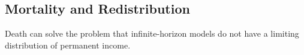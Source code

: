 \documentclass[BufferStockTheory]{subfiles}
\begin{document}
\begin{comment}
\hypertarget{Consumption-and-Income-Growth-at-the-Household-Level}{}
\subsection{Identical Growth in Income, Consumption, and Wealth}\label{subsec:cGroEqPGroIndQ}

Unfortunately, the {\GICNrm} condition that we imposed which yielded all of these intuitive propositions at once is rather restrictive.  Modeling experience indicates that it is not always possible to find plausible combinations of parameter values that satisfy that condition.  Furthermore, while the {\GIC} is a considerably looser condition, as noted above (and as

\end{comment}


\hypertarget{Mortality-And-Redistribution}{}
\subsection{Mortality and Redistribution}\label{sec:Mortality-And-Redistribution}

Death can solve the problem that infinite-horizon models do not have a limiting distribution of permanent income.

\hypertarget{Blanchard-Lives}{}
\end{document}
